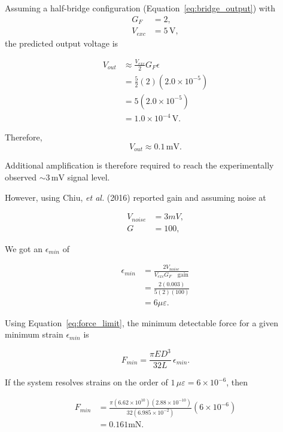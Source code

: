 Assuming a half-bridge configuration (Equation~\ref{eq:bridge_output}) with
\begin{align*}
	G_F &= 2, \\
	V_{exc} &= 5\,\text{V},
\end{align*}
the predicted output voltage is

\begin{align}
	V_{out} &\approx \frac{V_{exc}}{2} G_F \epsilon \nonumber\\
	&= \frac{5}{2}(2)(2.0\times10^{-5}) \nonumber\\
	&= 5(2.0\times10^{-5}) \nonumber\\
	&= 1.0\times10^{-4}\,\text{V}.
\end{align}

\noindent Therefore,
\begin{equation}
	V_{out} \approx 0.1\,\text{mV}.
\end{equation}

Additional amplification is therefore required to reach the experimentally observed 
$\sim 3\,\text{mV}$ signal level.

However, using Chiu, \textit{et al.} (2016) reported gain and assuming noise at

\begin{align*}
	V_{noise}  &= 3 mV, \\
	G &= 100,
\end{align*}

We got an $\epsilon_{min}$ of 

\begin{align}
	\epsilon_{min} &= 
			\frac{2 V_{noise}}{V_{exc} G_F \quad \text{gain}} \\
	&=	\frac{2 (0.003)}{5 (2) (100)} \\
	&=	6 \mu\varepsilon.
\end{align}

Using Equation~\ref{eq:force_limit}, the minimum detectable force for a given minimum strain $\epsilon_{min}$ is

\begin{equation}
	F_{min} = \frac{\pi E D^3}{32 L}\,\epsilon_{min}.
\end{equation}

If the system resolves strains on the order of $1\,\mu\varepsilon = 6\times10^{-6}$, then

\begin{align}
	F_{min} &= 
	\frac{\pi (6.62\times10^{10})(2.88\times10^{-10})}
	{32(6.985\times10^{-2})}
	(6\times10^{-6}) \nonumber\\
	&= 0.161 \text{mN}.
\end{align}

